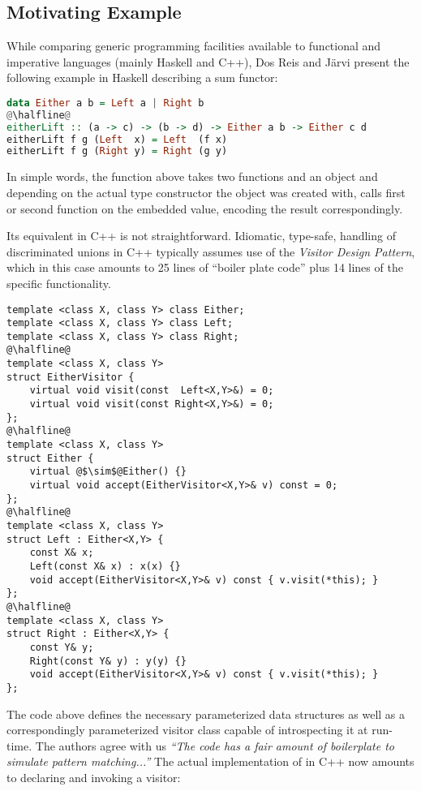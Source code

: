 \subsection{Motivating Example}
\label{sec:xmpl}

While comparing generic programming facilities available to functional and 
imperative languages (mainly Haskell and C++), Dos Reis and J\"arvi present the 
following example in Haskell describing a sum functor\cite{DRJ05}:

\begin{lstlisting}[language=Haskell,keepspaces]
data Either a b = Left a | Right b
@\halfline@
eitherLift :: (a -> c) -> (b -> d) -> Either a b -> Either c d
eitherLift f g (Left  x) = Left  (f x)
eitherLift f g (Right y) = Right (g y)
\end{lstlisting}

\noindent
In simple words, the function  above takes two functions and an 
object and depending on the actual type constructor the object was created with, 
calls first or second function on the embedded value, encoding the result 
correspondingly.

Its equivalent in C++ is not straightforward. Idiomatic, type-safe, handling of 
discriminated unions in C++ typically assumes use of the \emph{Visitor Design Pattern}\cite{DesignPatterns}, 
which in this case amounts to 25 lines of ``boiler plate code'' plus 14 lines 
of the specific functionality.

\begin{lstlisting}
template <class X, class Y> class Either;
template <class X, class Y> class Left;
template <class X, class Y> class Right;
@\halfline@
template <class X, class Y>
struct EitherVisitor {
    virtual void visit(const  Left<X,Y>&) = 0;
    virtual void visit(const Right<X,Y>&) = 0;
};
@\halfline@
template <class X, class Y>
struct Either {
    virtual @$\sim$@Either() {}
    virtual void accept(EitherVisitor<X,Y>& v) const = 0;
};
@\halfline@
template <class X, class Y>
struct Left : Either<X,Y> {
    const X& x;
    Left(const X& x) : x(x) {}
    void accept(EitherVisitor<X,Y>& v) const { v.visit(*this); }
};
@\halfline@
template <class X, class Y>
struct Right : Either<X,Y> {
    const Y& y;
    Right(const Y& y) : y(y) {}
    void accept(EitherVisitor<X,Y>& v) const { v.visit(*this); }
};
\end{lstlisting}

\noindent
The code above defines the necessary parameterized data structures as well as a 
correspondingly parameterized visitor class capable of introspecting it at 
run-time. The authors agree with us \emph{``The code has a fair amount of 
boilerplate to simulate pattern matching...''}\cite{DRJ05} The actual 
implementation of  in C++ now amounts to declaring and 
invoking a visitor:

